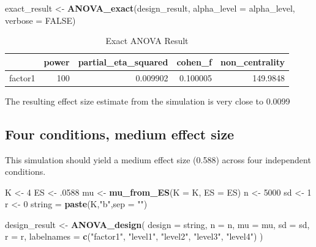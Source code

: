 \documentclass[]{book}
\newenvironment{Shaded}{\begin{snugshade}}{\end{snugshade}}
\newcommand{\DataTypeTok}[1]{\textcolor[rgb]{0.13,0.29,0.53}{#1}}
\newcommand{\DecValTok}[1]{\textcolor[rgb]{0.00,0.00,0.81}{#1}}
\newcommand{\FloatTok}[1]{\textcolor[rgb]{0.00,0.00,0.81}{#1}}
\newcommand{\KeywordTok}[1]{\textcolor[rgb]{0.13,0.29,0.53}{\textbf{#1}}}
\newcommand{\NormalTok}[1]{#1}
\newcommand{\OtherTok}[1]{\textcolor[rgb]{0.56,0.35,0.01}{#1}}
\newcommand{\StringTok}[1]{\textcolor[rgb]{0.31,0.60,0.02}{#1}}
\begin{document}
\begin{Shaded}
\begin{Highlighting}[]
\NormalTok{exact_result <-}\StringTok{ }\KeywordTok{ANOVA_exact}\NormalTok{(design_result,}
                            \DataTypeTok{alpha_level =}\NormalTok{ alpha_level,}
                            \DataTypeTok{verbose =} \OtherTok{FALSE}\NormalTok{)}
\end{Highlighting}
\end{Shaded}

\begin{table}[!h]

\caption{\label{tab:unnamed-chunk-82}Exact ANOVA Result}
\centering
\begin{tabular}{l|r|r|r|r}
\hline
  & power & partial\_eta\_squared & cohen\_f & non\_centrality\\
\hline
factor1 & 100 & 0.009902 & 0.100005 & 149.9848\\
\hline
\end{tabular}
\end{table}

The resulting effect size estimate from the simulation is very close to 0.0099

\hypertarget{four-conditions-medium-effect-size}{%
\subsection{Four conditions, medium effect size}\label{four-conditions-medium-effect-size}}

This simulation should yield a medium effect size (0.588) across four independent conditions.

\begin{Shaded}
\begin{Highlighting}[]
\NormalTok{K <-}\StringTok{ }\DecValTok{4}
\NormalTok{ES <-}\StringTok{ }\FloatTok{.0588}
\NormalTok{mu <-}\StringTok{ }\KeywordTok{mu_from_ES}\NormalTok{(}\DataTypeTok{K =}\NormalTok{ K, }\DataTypeTok{ES =}\NormalTok{ ES)}
\NormalTok{n <-}\StringTok{ }\DecValTok{5000}
\NormalTok{sd <-}\StringTok{ }\DecValTok{1}
\NormalTok{r <-}\StringTok{ }\DecValTok{0}
\NormalTok{string =}\StringTok{ }\KeywordTok{paste}\NormalTok{(K,}\StringTok{"b"}\NormalTok{,}\DataTypeTok{sep =} \StringTok{""}\NormalTok{)}
\end{Highlighting}
\end{Shaded}

\begin{Shaded}
\begin{Highlighting}[]
\NormalTok{design_result <-}\StringTok{ }\KeywordTok{ANOVA_design}\NormalTok{(}
  \DataTypeTok{design =}\NormalTok{ string,}
  \DataTypeTok{n =}\NormalTok{ n,}
  \DataTypeTok{mu =}\NormalTok{ mu,}
  \DataTypeTok{sd =}\NormalTok{ sd,}
  \DataTypeTok{r =}\NormalTok{ r,}
  \DataTypeTok{labelnames =} \KeywordTok{c}\NormalTok{(}\StringTok{"factor1"}\NormalTok{, }\StringTok{"level1"}\NormalTok{, }\StringTok{"level2"}\NormalTok{, }\StringTok{"level3"}\NormalTok{, }\StringTok{"level4"}\NormalTok{)}
\NormalTok{  )}
\end{Highlighting}
\end{Shaded}
\end{document}
